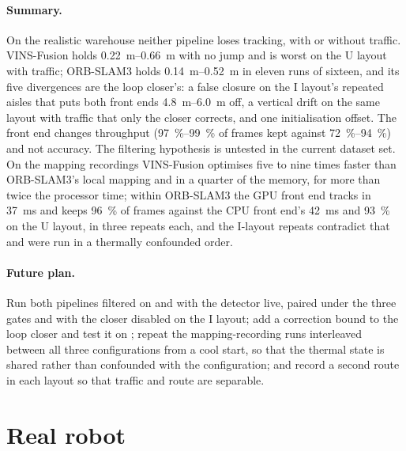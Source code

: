 \documentclass[11pt,a4paper,notitlepage]{report}
\begin{document}
\paragraph{Summary.} On the realistic warehouse neither pipeline loses
tracking, with or without traffic. VINS-Fusion holds \SIrange{0.22}{0.66}{\metre}
with no jump and is worst on the U layout with traffic; ORB-SLAM3 holds
\SIrange{0.14}{0.52}{\metre} in eleven runs of sixteen, and its five divergences
are the loop closer's: a false closure on the I layout's repeated aisles that
puts both front ends \SIrange{4.8}{6.0}{\metre} off, a vertical drift on the
same layout with traffic that only the closer corrects, and one
initialisation offset. The front end changes throughput
(\SIrange{97}{99}{\percent} of frames kept against \SIrange{72}{94}{\percent})
and not accuracy. The filtering hypothesis is untested in the current dataset
set. On the mapping recordings VINS-Fusion optimises five to nine times faster
than ORB-SLAM3's local mapping and in a quarter of the memory, for more than
twice the processor time; within ORB-SLAM3 the GPU front end tracks in
\SI{37}{\milli\second} and keeps \SI{96}{\percent} of frames against the CPU
front end's \SI{42}{\milli\second} and \SI{93}{\percent} on the U layout, in
three repeats each, and the I-layout repeats contradict that and were run in
a thermally confounded order.

\paragraph{Future plan.} Run both pipelines filtered on  and 
with the detector live, paired under the three gates and with the closer
disabled on the I layout; add a correction bound to the loop closer and test
it on ; repeat the mapping-recording runs interleaved
between all three configurations from a cool start, so that the thermal state
is shared rather than confounded with the configuration; and record
a second route in each layout so that traffic and route are separable.

\FloatBarrier
\section{Real robot}
\label{sec:exp3-real}
\end{document}
